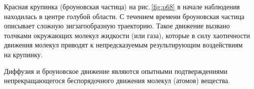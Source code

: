 \documentclass[main.tex]{subfiles}
\begin{document}
Красная крупинка (броуновская частица) на рис.\,\ref{fig:p68} в начале наблюдения находилась в центре голубой области. С течением времени броуновская частица описывает сложную зигзагообразную траекторию. Такое движение вызвано толчками окружающих молекул жидкости (или газа), которые в силу хаотичности движения молекул приводят к непредсказуемым результирующим воздействиям на крупинку.

Диффузия и броуновское движение являются опытными подтверждениями непрекращающегося беспорядочного движения молекул (атомов) вещества.




















 
\end{document}
